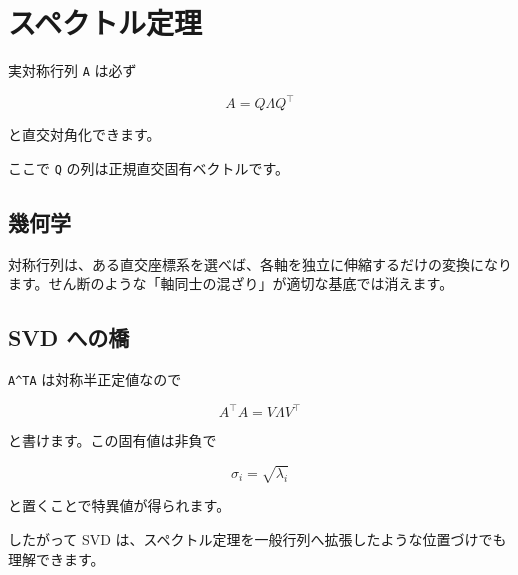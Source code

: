 \documentclass[
  11pt,
  a4paper,
]{ltjsarticle}
\author{}
\date{}
\begin{document}
\hypertarget{ux30b9ux30daux30afux30c8ux30ebux5b9aux7406}{%
\section{スペクトル定理}\label{ux30b9ux30daux30afux30c8ux30ebux5b9aux7406}}

実対称行列 \texttt{A} は必ず

\[
\boxed{A=Q\Lambda Q^\top}
\]

と直交対角化できます。

ここで \texttt{Q} の列は正規直交固有ベクトルです。

\hypertarget{ux5e7eux4f55ux5b66}{%
\subsection{幾何学}\label{ux5e7eux4f55ux5b66}}

対称行列は、ある直交座標系を選べば、各軸を独立に伸縮するだけの変換になります。せん断のような「軸同士の混ざり」が適切な基底では消えます。

\hypertarget{svd-ux3078ux306eux6a4b}{%
\subsection{SVD への橋}\label{svd-ux3078ux306eux6a4b}}

\texttt{A\^{}TA} は対称半正定値なので

\[
A^\top A=V\Lambda V^\top
\]

と書けます。この固有値は非負で

\[
\sigma_i=\sqrt{\lambda_i}
\]

と置くことで特異値が得られます。

したがって SVD
は、スペクトル定理を一般行列へ拡張したような位置づけでも理解できます。
\end{document}
